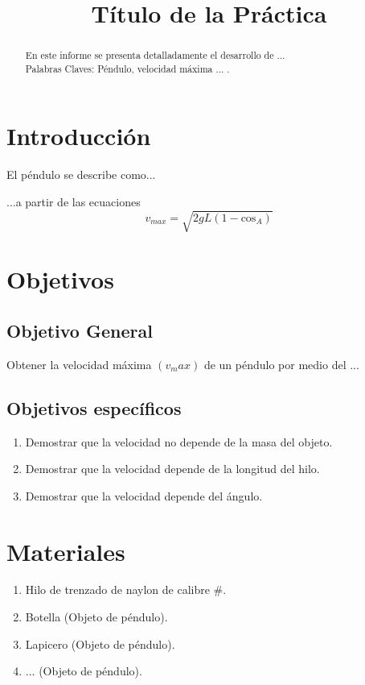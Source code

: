 \documentclass[journal]{IEEEtran}
\title{Título de la Práctica}
\author{
\authorblockA{Nombre 1 \\Nombre 2 \\...\\ Docente: ... \\ 
\today  }}
\begin{document}
\maketitle

\begin{abstract}
En este informe se presenta detalladamente el desarrollo de ...\\

Palabras Claves: Péndulo, velocidad máxima ... .
\end{abstract}


\section{Introducción}
 El péndulo se describe como...

 ...a partir de las ecuaciones 
$$v_{max}=\sqrt{2gL(1-\text{cos}_A)}$$
 


\section{Objetivos}

\subsection{Objetivo General}
Obtener la velocidad máxima $(v_max)$ de un péndulo por medio del ...

\subsection{Objetivos específicos}

\begin{enumerate}
    \item Demostrar que la velocidad no depende de la masa del objeto. 
    \item Demostrar que la velocidad depende de la longitud del hilo.
    \item Demostrar que la velocidad depende del ángulo.
\end{enumerate}


\section{Materiales}

\begin{enumerate}
    \item Hilo de trenzado de naylon de calibre \#.
    \item Botella (Objeto de péndulo).
    \item Lapicero (Objeto de péndulo).
    \item ... (Objeto de péndulo).
\end{enumerate}
\end{document}
